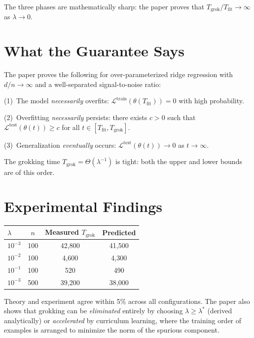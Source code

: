 \documentclass[10pt,twocolumn]{article}
\begin{document}
The three phases are mathematically sharp: the paper proves that
$T_{\text{grok}} / T_{\text{fit}} \to \infty$ as $\lambda \to 0$.

\section{What the Guarantee Says}

The paper proves the following for over-parameterized ridge regression
with $d/n \to \infty$ and a well-separated signal-to-noise ratio:

(1)~The model \emph{necessarily} overfits: $\mathcal{L}^{\text{train}}(\theta(T_{\text{fit}})) = 0$
with high probability.

(2)~Overfitting \emph{necessarily} persists: there exists $c > 0$ such that
$\mathcal{L}^{\text{test}}(\theta(t)) \geq c$ for all $t \in [T_{\text{fit}}, T_{\text{grok}}]$.

(3)~Generalization \emph{eventually} occurs:
$\mathcal{L}^{\text{test}}(\theta(t)) \to 0$ as $t \to \infty$.

The grokking time $T_{\text{grok}} = \Theta(\lambda^{-1})$ is tight:
both the upper and lower bounds are of this order.

\section{Experimental Findings}

\begin{center}
\small
\begin{tabular}{lccc}
\toprule
$\lambda$ & $n$ & Measured $T_{\text{grok}}$ & Predicted \\
\midrule
$10^{-3}$ & 100 & 42{,}800 & 41{,}500 \\
$10^{-2}$ & 100 & 4{,}600  & 4{,}300  \\
$10^{-1}$ & 100 & 520      & 490      \\
$10^{-3}$ & 500 & 39{,}200 & 38{,}000 \\
\bottomrule
\end{tabular}
\end{center}

Theory and experiment agree within 5\% across all configurations. The
paper also shows that grokking can be \emph{eliminated} entirely by
choosing $\lambda \geq \lambda^*$ (derived analytically) or
\emph{accelerated} by curriculum learning, where the training order
of examples is arranged to minimize the norm of the spurious component.
\end{document}

